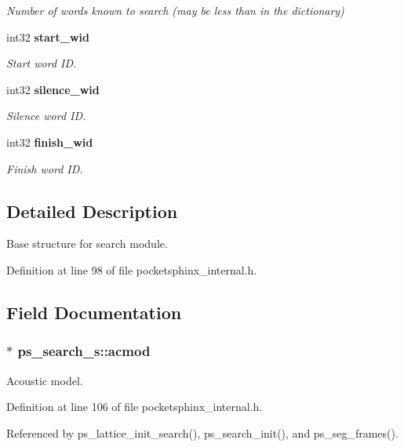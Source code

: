 \begin{DoxyCompactItemize}
\begin{DoxyCompactList}\small\item\em Number of words known to search (may be less than in the dictionary) \end{DoxyCompactList}\item 
int32 {\bf start\+\_\+wid}
\begin{DoxyCompactList}\small\item\em Start word I\+D. \end{DoxyCompactList}\item 
int32 {\bf silence\+\_\+wid}
\begin{DoxyCompactList}\small\item\em Silence word I\+D. \end{DoxyCompactList}\item 
int32 {\bf finish\+\_\+wid}
\begin{DoxyCompactList}\small\item\em Finish word I\+D. \end{DoxyCompactList}\end{DoxyCompactItemize}


\subsection{Detailed Description}
Base structure for search module. 

Definition at line 98 of file pocketsphinx\+\_\+internal.\+h.



\subsection{Field Documentation}
\subsubsection[{acmod}]{$\ast$ ps\+\_\+search\+\_\+s\+::acmod}\label{structps__search__s_a0fdf6fe8c4d9c28f10c48c09517c6b91}


Acoustic model. 



Definition at line 106 of file pocketsphinx\+\_\+internal.\+h.



Referenced by ps\+\_\+lattice\+\_\+init\+\_\+search(), ps\+\_\+search\+\_\+init(), and ps\+\_\+seg\+\_\+frames().

